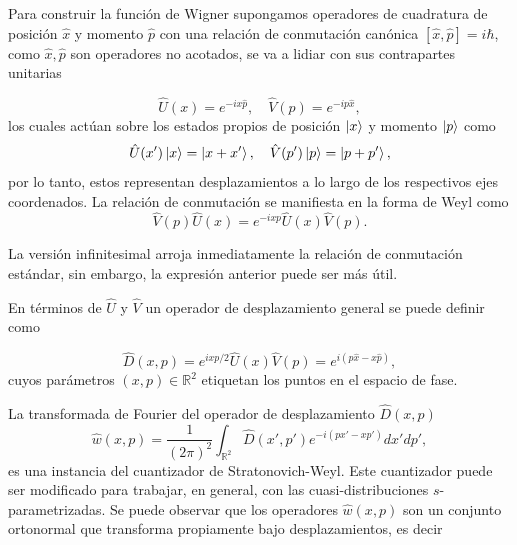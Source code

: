         Para construir la función de Wigner supongamos operadores  de cuadratura de posición $\hat{x}$ y momento $\hat{p}$ con una relación de conmutación canónica $[\hat{x},\hat{p}]=i\hbar$, como $\hat{x},\hat{p}$ son operadores no acotados, se va a lidiar con sus contrapartes unitarias 

        \begin{equation}
            \hat{U}(x) = e^{-ix\hat{p}}, \quad \hat{V}(p) = e^{-ip\hat{x}},
        \end{equation}
        los cuales actúan sobre los estados propios de posición $\ket{x}$ y momento $\ket{p}$ como
        \begin{equation}
            \hat{U}(x')\ket{x} = \ket{x+x'}, \quad\hat{V}(p')\ket{p} = \ket{p+p'},
        \end{equation}
        por lo tanto, estos representan desplazamientos a lo largo de los respectivos ejes coordenados. La relación de conmutación se manifiesta en la forma de Weyl como
        \begin{equation}
            \hat{V}(p)\hat{U}(x) = e^{-ixp}\hat{U}(x)\hat{V}(p).
        \end{equation}

        La versión infinitesimal arroja inmediatamente la relación de conmutación estándar, sin embargo, la expresión anterior puede ser más útil.

        En términos de $\hat{U}$ y $\hat{V}$ un operador de desplazamiento general se puede definir como

        \begin{equation}
            \hat{D}(x,p) = e^{ixp/2}\hat{U}(x)\hat{V}(p)= e^{i \left( p\hat{x} - x\hat{p} \right)},
        \end{equation}
        cuyos parámetros $(x,p) \in \mathbb{R}^2$ etiquetan los puntos en el espacio de fase. 

        La transformada de Fourier del operador de desplazamiento $\hat{D}(x,p)$
        \begin{equation}
            \hat{w}(x,p) = \frac{1}{(2\pi)^2}\int_{\mathbb{R}^2} \hat{D}(x',p')  e^{-i \left( px' - xp' \right)}dx'dp',
        \end{equation}
        es una instancia del cuantizador de Stratonovich-Weyl. Este cuantizador puede ser modificado para trabajar, en general, con las cuasi-distribuciones $s$-parametrizadas. Se puede observar que los operadores $\hat{w}(x,p)$ son un conjunto ortonormal que transforma propiamente bajo desplazamientos, es decir

